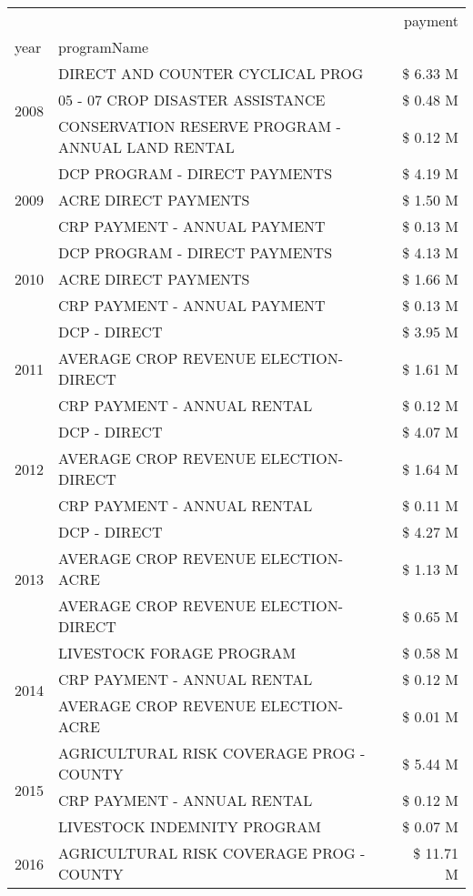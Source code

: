 \begin{tabular}{llr}
\toprule
 &  & payment \\
year & programName &  \\
\midrule
\multirow[t]{3}{*}{2008} & DIRECT AND COUNTER CYCLICAL PROG & \$ 6.33 M \\
 & 05 - 07 CROP DISASTER ASSISTANCE & \$ 0.48 M \\
 & CONSERVATION RESERVE PROGRAM - ANNUAL LAND RENTAL & \$ 0.12 M \\
\cline{1-3}
\multirow[t]{3}{*}{2009} & DCP PROGRAM - DIRECT PAYMENTS & \$ 4.19 M \\
 & ACRE DIRECT PAYMENTS & \$ 1.50 M \\
 & CRP PAYMENT - ANNUAL PAYMENT & \$ 0.13 M \\
\cline{1-3}
\multirow[t]{3}{*}{2010} & DCP PROGRAM - DIRECT PAYMENTS & \$ 4.13 M \\
 & ACRE DIRECT PAYMENTS & \$ 1.66 M \\
 & CRP PAYMENT - ANNUAL PAYMENT & \$ 0.13 M \\
\cline{1-3}
\multirow[t]{3}{*}{2011} & DCP - DIRECT & \$ 3.95 M \\
 & AVERAGE CROP REVENUE ELECTION-DIRECT & \$ 1.61 M \\
 & CRP PAYMENT - ANNUAL RENTAL & \$ 0.12 M \\
\cline{1-3}
\multirow[t]{3}{*}{2012} & DCP - DIRECT & \$ 4.07 M \\
 & AVERAGE CROP REVENUE ELECTION-DIRECT & \$ 1.64 M \\
 & CRP PAYMENT - ANNUAL RENTAL & \$ 0.11 M \\
\cline{1-3}
\multirow[t]{3}{*}{2013} & DCP - DIRECT & \$ 4.27 M \\
 & AVERAGE CROP REVENUE ELECTION-ACRE & \$ 1.13 M \\
 & AVERAGE CROP REVENUE ELECTION-DIRECT & \$ 0.65 M \\
\cline{1-3}
\multirow[t]{3}{*}{2014} & LIVESTOCK FORAGE PROGRAM & \$ 0.58 M \\
 & CRP PAYMENT - ANNUAL RENTAL & \$ 0.12 M \\
 & AVERAGE CROP REVENUE ELECTION-ACRE & \$ 0.01 M \\
\cline{1-3}
\multirow[t]{3}{*}{2015} & AGRICULTURAL RISK COVERAGE PROG - COUNTY & \$ 5.44 M \\
 & CRP PAYMENT - ANNUAL RENTAL & \$ 0.12 M \\
 & LIVESTOCK INDEMNITY PROGRAM & \$ 0.07 M \\
\cline{1-3}
\multirow[t]{3}{*}{2016} & AGRICULTURAL RISK COVERAGE PROG - COUNTY & \$ 11.71 M \\

\end{tabular}

